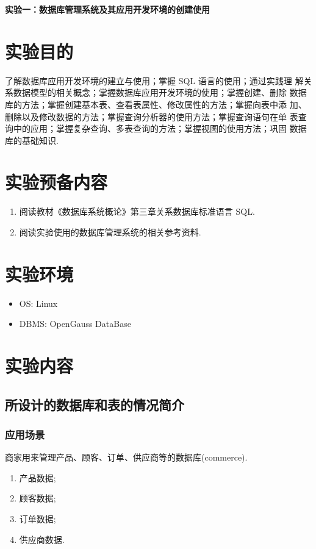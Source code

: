 \begin{center}
\textbf{实验一：数据库管理系统及其应用开发环境的创建使用}
\end{center}

\section{实验目的}
了解数据库应用开发环境的建立与使用；掌握 SQL 语言的使用；通过实践理
解关系数据模型的相关概念；掌握数据库应用开发环境的使用；掌握创建、删除
数据库的方法；掌握创建基本表、查看表属性、修改属性的方法；掌握向表中添
加、删除以及修改数据的方法；掌握查询分析器的使用方法；掌握查询语句在单
表查询中的应用；掌握复杂查询、多表查询的方法；掌握视图的使用方法；巩固
数据库的基础知识.

\section{实验预备内容}
\begin{enumerate}
  \item 阅读教材《数据库系统概论》第三章关系数据库标准语言 SQL.
  \item 阅读实验使用的数据库管理系统的相关参考资料.
\end{enumerate}

\section{实验环境}
\begin{itemize}
  \item OS: Linux
  \item DBMS: OpenGauss DataBase
\end{itemize}

\section{实验内容}

\subsection{所设计的数据库和表的情况简介}

\subsubsection{应用场景}

商家用来管理产品、顾客、订单、供应商等的数据库(commerce).
\begin{enumerate}
  \item 产品数据;
  \item 顾客数据;
  \item 订单数据;
  \item 供应商数据.
\end{enumerate}

